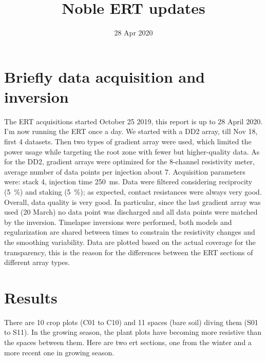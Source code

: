 \documentclass[a4paper,12pt]{article}
\title{Noble ERT updates}
\author{}
\date{28 Apr 2020}
\begin{document}
\setcounter{secnumdepth}{0} %
\newcommand{\myseparator}{\noindent\makebox[\linewidth]{\resizebox{0.5\linewidth}{1pt}{$\bullet$}}\bigskip}
\newcommand{\subwidth}{0.48}
\graphicspath{{./../}{./../figures/}{./figures/}}


\section{Briefly data acquisition and inversion}
The ERT acquisitions started October 25 2019, this report is up to 28 April 2020.
I'm now running the ERT once a day.
We started with a DD2 array, till Nov 18, first 4 datasets.
Then two types of gradient array were used, which limited the power usage while targeting the root zone with fewer but higher-quality data.
As for the DD2, gradient arrays were optimized for the 8-channel resistivity meter, average number of data points per injection about 7.
Acquisition parameters were: stack \num{4}, injection time \SI{250}{\milli\second}.
Data were filtered considering reciprocity (\SI{5}{\percent}) and staking (\SI{5}{\percent}); as expected, contact resistances were always very good.
Overall, data quality is very good.
In particular, since the last gradient array was used (20 March) no data point was discharged and all data points were matched by the inversion.
Timelapse inversions were performed, both models and regularization are shared between times to constrain the resistivity changes and the smoothing variability.
Data are plotted based on the actual coverage for the transparency, this is the reason for the differences between the ERT sections of different array types.

\section{Results}
There are 10 crop plots (C01 to C10) and 11 spaces (bare soil) diving them (S01 to S11).
In the growing season, the plant plots have becoming more resistive than the spaces between them.
Here are two ert sections, one from the winter and a more recent one in growing season.
\end{document}
